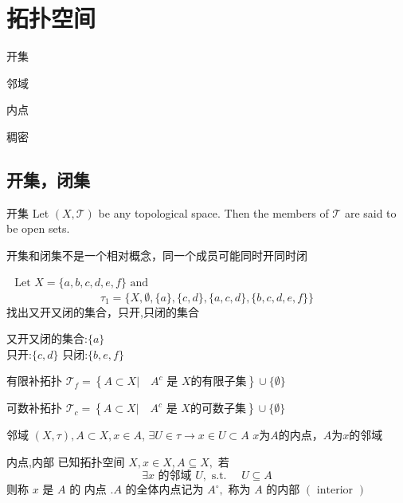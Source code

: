 \chapter{拓扑空间}
\begin{introduction}
	\item 开集
	\item 邻域
	\item 内点
	\item 稠密
\end{introduction}
\section{开集，闭集}
\begin{definition}{开集}
\noindent Let $(X, \mathcal{T})$ be any topological space. Then the members of $\mathcal{T}$ are said to be open sets.
\end{definition}
\begin{remark}
	开集和闭集不是一个相对概念，同一个成员可能同时开同时闭
\end{remark}
\begin{example}
	$\begin{array}{lll}  \text { Let } X=\{a, b, c, d, e, f\} \text { and }\end{array}$
	\[
	\tau_{1}=\{X, \emptyset,\{a\},\{c, d\},\{a, c, d\},\{b, c, d, e, f\}\}
	\]
	找出又开又闭的集合，只开,只闭的集合
\end{example}
\begin{remark}
	又开又闭的集合:$\{a\}$ \\
	只开:$\{c, d\}$
	只闭:$\{b,e,f\}$
\end{remark}
\begin{definition}{有限补拓扑}
	$\mathcal{T}_{f}=\left\{A \subset X | \quad A^{c} \text { 是 } X \text {的有限子集}\right\} \cup\{\emptyset\}$
\end{definition}
\begin{definition}{可数补拓扑}
	$\mathcal{T}_{c}=\left\{A \subset X | \quad A^{c} \text { 是 } X \text {的可数子集}\right\} \cup\{\emptyset\}$
\end{definition}
\begin{definition}{邻域}
\noindent $(X,\tau) ,A\subset X,x \in A$,
$\exists U \in \tau\rightarrow x \in U \subset A$
$x$为$A$的内点，$A$为$x$的邻域
\end{definition}
\begin{definition}{内点,内部}
\noindent	 已知拓扑空间 $X, x \in X, A \subseteq X,$ 若
	\[
	\exists x \text { 的邻域 } U, \text { s.t. } \quad U \subseteq A
	\]
	则称 $x$ 是 $A$ 的 内点 $. A$ 的全体内点记为 $A^{\circ},$ 称为 $A$ 的内部 $(\text { interior })$
\end{definition}
